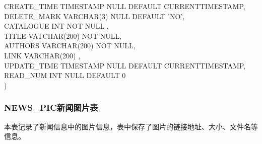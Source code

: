 \begin{enumerate}
            CREATE\_TIME TIMESTAMP NULL DEFAULT CURRENTTIMESTAMP,\\
            DELETE\_MARK VARCHAR(3) NULL DEFAULT 'NO',\\
            CATALOGUE INT NOT NULL ,\\
            TITLE VATCHAR(200) NOT NULL,\\
            AUTHORS VARCHAR(200) NOT NULL,\\
            LINK VARCHAR(200) ,\\
            UPDATE\_TIME TIMESTAMP NULL DEFAULT CURRENTTIMESTAMP,\\
            READ\_NUM INT NULL DEFAULT 0\\
        )
    \end{enumerate}

\subsubsection{NEWS\_PIC新闻图片表}
本表记录了新闻信息中的图片信息，表中保存了图片的链接地址、大小、文件名等信息。

